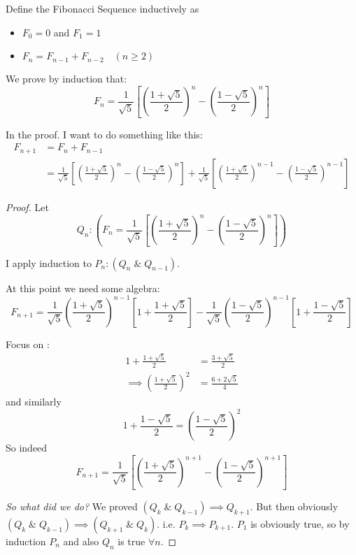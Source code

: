 \documentclass[twoside]{scrartcl}
\begin{document}
\begin{example}
Define the Fibonacci Sequence inductively as 
\begin{itemize}
\item $F_0 = 0$ and $F_1 = 1$
\item $F_n = F_{n-1} + F_{n-2}\quad (n \geq 2)$	
\end{itemize}

We prove by induction that: 
\[F_n = \frac{1}{\sqrt{5}} \left[\left(\frac{1+\sqrt{5}}{2}\right)^n - \left(\frac{1-\sqrt{5}}{2}\right)^n\right]\]
	
In the proof. I want to do something like this: 
\[
\begin{aligned}
  F_{n+1} &= F_n + F_{n-1} \\ 
  &= \frac{1}{\sqrt{5}} \left[\left(\frac{1+\sqrt{5}}{2}\right)^n - \left(\frac{1-\sqrt{5}}{2}\right)^n\right]
  + \frac{1}{\sqrt{5}} \left[\left(\frac{1+\sqrt{5}}{2}\right)^{n-1} - \left(\frac{1-\sqrt{5}}{2}\right)^{n-1}\right]
\end{aligned}
\]

\vspace*{5pt}
\begin{proof}
Let 
\[Q_n: \left(F_n = \frac{1}{\sqrt{5}} \left[\left(\frac{1+\sqrt{5}}{2}\right)^n - \left(\frac{1-\sqrt{5}}{2}\right)^n\right]\right)\]	

I apply induction to $P_n: (Q_n \;\&\; Q_{n-1})$. 

At this point we need some algebra: 
\[F_{n+1} = \frac{1}{\sqrt{5}} \left(\frac{1+\sqrt{5}}{2}\right)^{n-1}\left[1+ \frac{1+\sqrt{5}}{2}\right] - \frac{1}{\sqrt{5}}\left(\frac{1-\sqrt{5}}{2}\right)^{n-1}\left[1 +\frac{1-\sqrt{5}}{2}\right]  \]


Focus on :
\[
\begin{aligned}
  1 + \frac{1+\sqrt{5}}{2} &= \frac{3 + \sqrt{5}}{2}\\
  \implies \left(\frac{1+ \sqrt{5}}{2}\right)^2 &= \frac{6 + 2\sqrt{5}}{4}
\end{aligned}
\]
and similarly 
\[1 + \frac{1-\sqrt{5}}{2} = \left(\frac{1-\sqrt{5}}{2}\right)^2\]
So indeed
\[F_{n+1} = \frac{1}{\sqrt{5}} \left[\left(\frac{1+\sqrt{5}}{2}\right)^{n+1} - \left(\frac{1-\sqrt{5}}{2}\right)^{n+1}\right]\]
\vspace*{5pt}

\emph{So what did we do?} We proved $(Q_k \; \& \; Q_{k-1})\implies Q_{k+1}$. But then obviously $(Q_k \; \& \; Q_{k-1})\implies (Q_{k+1} \;\&\; Q_k)$. i.e. $P_k \implies P_{k+1}$. $P_1$ is obviously true, so by induction $P_n$ and also $Q_n$ is true $\forall n$. 
\end{proof}
\end{example}
\end{document}
